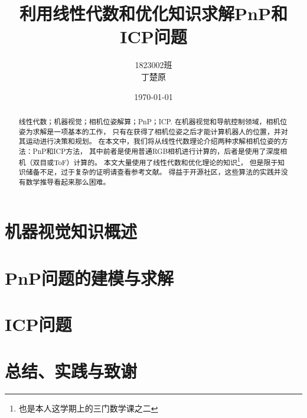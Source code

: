 \documentclass[bachelor,fontset=fandol,AutoFakeBold=true]{nuaathesis}
\begin{document}
\title{利用线性代数和优化知识求解PnP和ICP问题}
\author{1823002班 \\ 丁楚原}
\date{\today}
\maketitle

\frontmatter                            %
\tableofcontents                   %
\begin{abstract}{线性代数；机器视觉；相机位姿解算；PnP；ICP.}
在机器视觉和导航控制领域，相机位姿为求解是一项基本的工作，
只有在获得了相机位姿之后才能计算机器人的位置，并对其运动进行决策和规划。
在本文中，我们将从线性代数理论介绍两种求解相机位姿的方法：PnP和ICP方法，
其中前者是使用普通RGB相机进行计算的，后者是使用了深度相机（双目或ToF）计算的。
本文大量使用了线性代数和优化理论的知识\footnote{也是本人这学期上的三门数学课之二}，
但是限于知识储备不足，过于复杂的证明请查看参考文献。
得益于开源社区，这些算法的实践并没有数学推导看起来那么困难。
\end{abstract}
\mainmatter                             %
\pagestyle{plain}                   %

\chapter{机器视觉知识概述}

\chapter{PnP问题的建模与求解}

\chapter{ICP问题}

\chapter{总结、实践与致谢}


\backmatter                             %
\printbibliography[heading=bibintoc]
\end{document}
